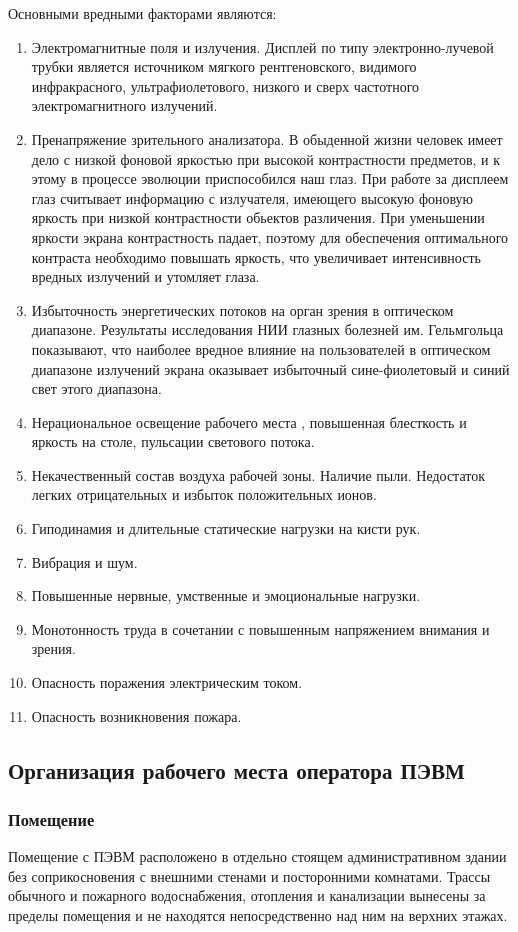 Основными вредными факторами являются:
\begin{enumerate}
	\item{} Электромагнитные поля и излучения.
		Дисплей по типу электронно-лучевой трубки является источником мягкого рентгеновского,
		видимого инфракрасного, ультрафиолетового, низкого и сверх
		частотного электромагнитного излучений.
	\item{} Пренапряжение зрительного анализатора.
		В обыденной жизни человек имеет дело с низкой фоновой яркостью при высокой
		контрастности предметов, и к этому в процессе эволюции приспособился наш глаз.
		При работе за дисплеем глаз считывает информацию  с излучателя, имеющего
		высокую фоновую яркость при низкой контрастности обьектов различения.
		При уменьшении яркости экрана контрастность падает, поэтому для обеспечения
		оптимального контраста необходимо повышать яркость, что увеличивает интенсивность
		вредных излучений и утомляет глаза.
	\item{} Избыточность энергетических потоков на орган зрения в оптическом диапазоне.
		Результаты исследования НИИ глазных болезней им. Гельмгольца показывают,
		что наиболее вредное влияние на пользователей в оптическом диапазоне излучений экрана
		оказывает избыточный сине-фиолетовый и синий свет этого диапазона.
	\item{} Нерациональное освещение рабочего места , повышенная блесткость и яркость на столе,
		пульсации светового потока.
	\item{} Некачественный состав воздуха рабочей зоны. Наличие пыли. Недостаток
		легких отрицательных и избыток положительных ионов.
	\item{} Гиподинамия и длительные статические нагрузки на кисти рук.
	\item{} Вибрация и шум.
	\item{} Повышенные нервные, умственные и эмоциональные нагрузки.
	\item{} Монотонность труда в сочетании с повышенным напряжением внимания и зрения.
	\item{} Опасность поражения электрическим током.
	\item{} Опасность возникновения пожара.
\end{enumerate}

\subsection{Организация рабочего места оператора ПЭВМ}
\subsubsection{Помещение}
Помещение с ПЭВМ расположено в отдельно стоящем административном здании без соприкосновения
с внешними стенами и посторонними комнатами. Трассы обычного и пожарного водоснабжения,
отопления и канализации вынесены за пределы помещения  и не находятся непосредственно над ним
на верхних этажах.



